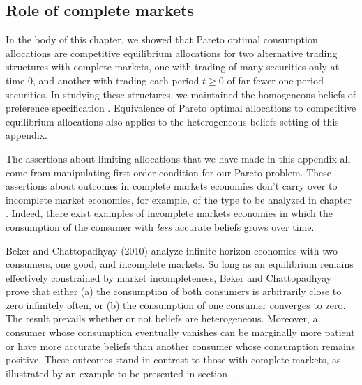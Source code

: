 \subsection{Role of complete markets}
In the body of this chapter, we showed that   Pareto optimal  consumption allocations are  competitive equilibrium allocations
for two alternative trading structures with complete markets, one with  trading of many securities only at time $0$, and another with trading each
period $t \geq 0$ of far fewer one-period securities.  In studying these structures, we maintained the
homogeneous beliefs  of preference specification .  Equivalence of  Pareto optimal allocations to competitive equilibrium allocations
 also applies to the heterogeneous beliefs setting of this appendix.

The assertions about limiting allocations that we have made in  this appendix  all come from manipulating  first-order condition  for our  Pareto problem. These assertions about  outcomes in complete markets economies don't carry over to
incomplete market economies, for example, of the type to be analyzed in chapter .   Indeed, there exist examples of incomplete markets
economies in which the consumption of the consumer with {\it less\/} accurate beliefs grows over time.

%
%
%
%
%





Beker and Chattopadhyay (2010) analyze infinite horizon
economies with two consumers, one good, and incomplete markets.
So long as an equilibrium remains effectively constrained
by market incompleteness, Beker and Chattopadhyay prove that either (a) the consumption
of both consumers is arbitrarily close to zero infinitely often,
or (b) the consumption of one consumer
converges to zero. The result prevails  whether or not
beliefs are  heterogeneous. Moreover, a consumer whose consumption eventually
vanishes can be marginally more patient or have  more
accurate beliefs than another consumer whose consumption remains positive.  These outcomes stand in contrast to
those  with complete markets, as illustrated
by an  example to be presented in section .

%
%

